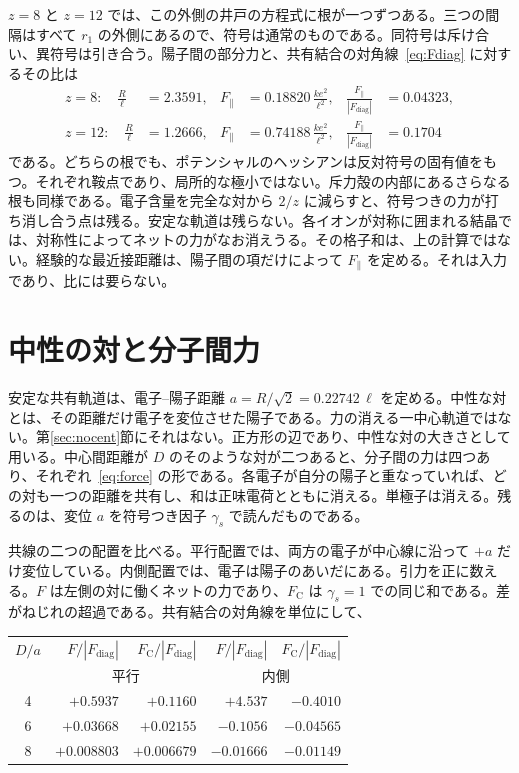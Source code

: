 \documentclass[a4paper]{article}
\begin{document}
\(z=8\) と \(z=12\) では、この外側の井戸の方程式に根が一つずつある。三つの間隔はすべて \(r_1\) の外側にあるので、符号は通常のものである。同符号は斥け合い、異符号は引き合う。陽子間の部分力と、共有結合の対角線~\eqref{eq:Fdiag} に対するその比は
\begin{align}
z=8:\quad
\frac{R}{\ell}&=2.3591,&
F_{\parallel}&=0.18820\,\frac{k e^{2}}{\ell^{2}},&
\frac{F_{\parallel}}{|F_{\mathrm{diag}}|}&=0.04323,
\label{eq:ratio8}\\
z=12:\quad
\frac{R}{\ell}&=1.2666,&
F_{\parallel}&=0.74188\,\frac{k e^{2}}{\ell^{2}},&
\frac{F_{\parallel}}{|F_{\mathrm{diag}}|}&=0.1704
\label{eq:ratio12}
\end{align}
である。どちらの根でも、ポテンシャルのヘッシアンは反対符号の固有値をもつ。それぞれ鞍点であり、局所的な極小ではない。斥力殻の内部にあるさらなる根も同様である。電子含量を完全な対から \(2/z\) に減らすと、符号つきの力が打ち消し合う点は残る。安定な軌道は残らない。各イオンが対称に囲まれる結晶では、対称性によってネットの力がなお消えうる。その格子和は、上の計算ではない。経験的な最近接距離は、陽子間の項だけによって \(F_{\parallel}\) を定める。それは入力であり、比には要らない。

\section{中性の対と分子間力}
\label{sec:inter}

安定な共有軌道は、電子--陽子距離 \(a=R/\sqrt{2}=0.22742\,\ell\) を定める。中性な対とは、その距離だけ電子を変位させた陽子である。力の消える一中心軌道ではない。第\ref{sec:nocent}節にそれはない。正方形の辺であり、中性な対の大きさとして用いる。中心間距離が \(D\) のそのような対が二つあると、分子間の力は四つあり、それぞれ~\eqref{eq:force} の形である。各電子が自分の陽子と重なっていれば、どの対も一つの距離を共有し、和は正味電荷とともに消える。単極子は消える。残るのは、変位 \(a\) を符号つき因子 \(\gamma_s\) で読んだものである。

共線の二つの配置を比べる。平行配置では、両方の電子が中心線に沿って \(+a\) だけ変位している。内側配置では、電子は陽子のあいだにある。引力を正に数える。\(F\) は左側の対に働くネットの力であり、\(F_{\mathrm{C}}\) は \(\gamma_s=1\) での同じ和である。差がねじれの超過である。共有結合の対角線を単位にして、

\begin{center}
\begin{tabular}{crrrr}
\(D/a\) & \(F/|F_{\mathrm{diag}}|\) & \(F_{\mathrm{C}}/|F_{\mathrm{diag}}|\) & \(F/|F_{\mathrm{diag}}|\) & \(F_{\mathrm{C}}/|F_{\mathrm{diag}}|\) \\
 & \multicolumn{2}{c}{平行} & \multicolumn{2}{c}{内側} \\
4 & \(+0.5937\) & \(+0.1160\) & \(+4.537\) & \(-0.4010\) \\
6 & \(+0.03668\) & \(+0.02155\) & \(-0.1056\) & \(-0.04565\) \\
8 & \(+0.008803\) & \(+0.006679\) & \(-0.01666\) & \(-0.01149\) \\
\end{tabular}
\end{center}
\end{document}

